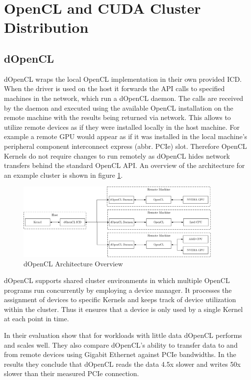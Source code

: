 \section{OpenCL and CUDA Cluster Distribution}
\label{cluster_distribution}
\subsection*{dOpenCL}

dOpenCL wraps the local OpenCL implementation in their own provided ICD. When the driver is used on the host it forwards the API calls to specified machines in the network, which run a dOpenCL daemon\cite{dopencl}. The calls are received by the daemon and executed using the available OpenCL installation on the remote machine with the results being returned via network. This allows to utilize remote devices as if they were installed locally in the host machine. For example a remote GPU would appear as if it was installed in the local machine's peripheral component interconnect express (abbr. PCIe) slot. Therefore OpenCL Kernels do not require changes to run remotely as dOpenCL hides network transfers behind the standard OpenCL API. An overview of the architecture for an example cluster is shown in figure \ref{img:dopencl_arch}.

\begin{figure}[H]
	
	\includegraphics[width=0.9\textwidth]{drawings/dopencl_arch.pdf}
	\centering
	\caption{dOpenCL Architecture Overview}
	\label{img:dopencl_arch}
\end{figure}

dOpenCL supports shared cluster environments in which multiple OpenCL programs run concurrently by employing a device manager. It processes the assignment of devices to specific Kernels and keeps track of device utilization within the cluster. Thus it ensures that a device is only used by a single Kernel at each point in time.

In their evaluation \citeauthor{dopencl} show that for workloads with little data dOpenCL performs and scales well. They also compare dOpenCL's ability to transfer data to and from remote devices using Gigabit Ethernet against PCIe bandwidths. In the results they conclude that dOpenCL reads the data 4.5x slower and writes 50x slower than their measured PCIe connection.

